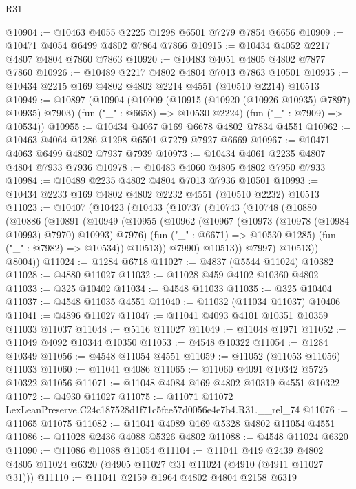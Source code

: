 \begin{lexlean}{R31}
\begin{coremodule}
@10904 := @10463 @4055 @2225 @1298 @6501 @7279 @7854 @6656
@10909 := @10471 @4054 @6499 @4802 @7864 @7866
@10915 := @10434 @4052 @2217 @4807 @4804 @7860 @7863
@10920 := @10483 @4051 @4805 @4802 @7877 @7860
@10926 := @10489 @2217 @4802 @4804 @7013 @7863 @10501
@10935 := @10434 @2215 @169 @4802 @4802 @2214 @4551 (@10510 @2214) @10513
@10949 := @10897
    (@10904
      (@10909 (@10915 (@10920 (@10926 @10935) @7897) @10935) @7903)
      (fun ("_" : @6658) => @10530 @2224)
      (fun ("_" : @7909) => @10534))
@10955 := @10434 @4067 @169 @6678 @4802 @7834 @4551
@10962 := @10463 @4064 @1286 @1298 @6501 @7279 @7927 @6669
@10967 := @10471 @4063 @6499 @4802 @7937 @7939
@10973 := @10434 @4061 @2235 @4807 @4804 @7933 @7936
@10978 := @10483 @4060 @4805 @4802 @7950 @7933
@10984 := @10489 @2235 @4802 @4804 @7013 @7936 @10501
@10993 := @10434 @2233 @169 @4802 @4802 @2232 @4551 (@10510 @2232) @10513
@11023 := @10407
    (@10423
      (@10433
        (@10737
          (@10743
            (@10748
              (@10880
                (@10886
                  (@10891
                    (@10949
                      (@10955
                        (@10962
                          (@10967 (@10973 (@10978 (@10984 @10993) @7970) @10993) @7976)
                          (fun ("_" : @6671) => @10530 @1285)
                          (fun ("_" : @7982) => @10534))
                        @10513))
                    @7990)
                  @10513))
              @7997)
            @10513))
        @8004))
@11024 := @1284 @6718
@11027 := @4837 (@5544 @11024) @10382
@11028 := @4880 @11027
@11032 := @11028 @459 @4102 @10360 @4802
@11033 := @325 @10402
@11034 := @4548 @11033
@11035 := @325 @10404
@11037 := @4548 @11035 @4551
@11040 := @11032 (@11034 @11037) @10406
@11041 := @4896 @11027
@11047 := @11041 @4093 @4101 @10351 @10359 @11033 @11037
@11048 := @5116 @11027
@11049 := @11048 @1971
@11052 := @11049 @4092 @10344 @10350
@11053 := @4548 @10322
@11054 := @1284 @10349
@11056 := @4548 @11054 @4551
@11059 := @11052 (@11053 @11056) @11033
@11060 := @11041 @4086
@11065 := @11060 @4091 @10342 @5725 @10322 @11056
@11071 := @11048 @4084 @169 @4802 @10319 @4551 @10322
@11072 := @4930 @11027
@11075 := @11071 @11072 LexLeanPreserve.C24c187528d1f71c5fce57d0056e4e7b4.R31.__rel_74
@11076 := @11065 @11075
@11082 := @11041 @4089 @169 @5328 @4802 @11054 @4551
@11086 := @11028 @2436 @4088 @5326 @4802
@11088 := @4548 @11024 @6320
@11090 := @11086 @11088 @11054
@11104 := @11041
    @419
    @2439
    @4802
    @4805
    @11024
    @6320
    (@4905 @11027 @31 @11024 (@4910 (@4911 @11027 @31)))
@11110 := @11041 @2159 @1964 @4802 @4804 @2158 @6319

\end{coremodule}
\end{lexlean}
